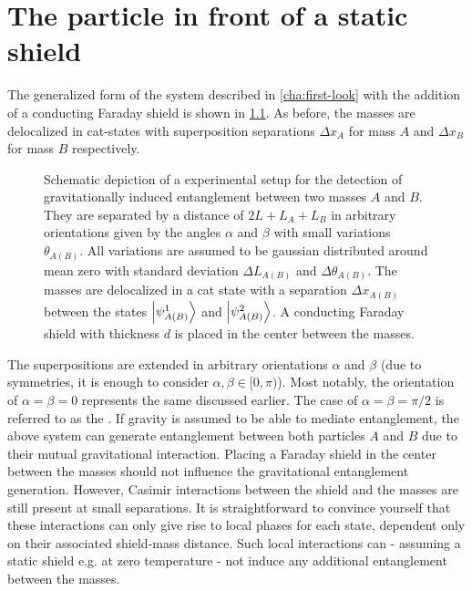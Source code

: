 \chapter{The particle in front of a static shield}\label{cha:entanglement-generation}

The generalized form of the system described in \cref{cha:first-look} with the addition of a conducting Faraday shield is shown in \cref{fig:4:complete-setup}. As before, the masses are delocalized in cat-states with superposition separations $\Delta x_A$ for mass $A$ and $\Delta x_B$ for mass $B$ respectively.
\begin{figure}[!htbp]
  \centering
  \def\svgwidth{\textwidth}
  
  \caption{Schematic depiction of a experimental setup for the detection of gravitationally induced entanglement between two masses $A$ and $B$. They are separated by a distance of $2L + L_A + L_B$ in arbitrary orientations given by the angles $\alpha$ and $\beta$ with small variations $\theta_{A(B)}$. All variations are assumed to be gaussian distributed around mean zero with standard deviation $\Delta L_{A(B)}$ and $\Delta \theta_{A(B)}$. The masses are delocalized in a cat state with a separation $\Delta x_{A(B)}$ between the states $\ket{\psi_{A(B)}^1}$ and $\ket{\psi_{A(B)}^2}$. A conducting Faraday shield with thickness $d$ is placed in the center between the masses.}
  \label{fig:4:complete-setup}
\end{figure}
The superpositions are extended in arbitrary orientations $\alpha$ and $\beta$ (due to symmetries, it is enough to consider $\alpha, \beta \in [0, \pi)$). Most notably, the orientation of $\alpha = \beta = 0$ represents the same  discussed earlier. 
The case of $\alpha = \beta = \pi/2$ is referred to as the .
If gravity is assumed to be able to mediate entanglement, the above system can generate entanglement between both particles $A$ and $B$ due to their mutual gravitational interaction.
Placing a Faraday shield in the center between the masses should not influence the gravitational entanglement generation.
However, Casimir interactions between the shield and the masses are still present at small separations.
It is straightforward to convince yourself that these interactions can only give rise to local phases for each state, dependent only on their associated shield-mass distance.
Such local interactions can - assuming a static shield e.g. at zero temperature - not induce any additional entanglement between the masses.

